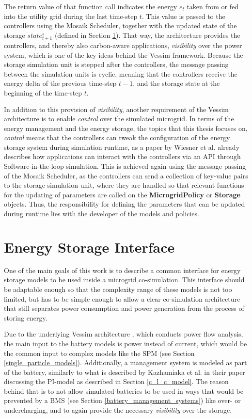The return value of that function call indicates the energy $e_t$ taken from or fed into the utility grid during the last time-step $t$. This value is passed to the controllers using the Mosaik Scheduler, together with the updated state of the storage $state_{t+1}^s$ (defined in Section \ref{energy_storage_interface}). That way, the architecture provides the controllers, and thereby also carbon-aware applications, \textit{visibility} over the power system, which is one of the key ideas behind the Vessim framework. Because the storage simulation unit is stepped after the controllers, the message passing between the simulation units is cyclic, meaning that the controllers receive the energy delta of the previous time-step $t-1$, and the storage state at the beginning of the time-step $t$.

In addition to this provision of \textit{visibility}, another requirement of the Vessim architecture is to enable \textit{control} over the simulated microgrid. In terms of the energy management and the energy storage, the topics that this thesis focuses on, \textit{control} means that the controllers can tweak the configuration of the energy storage system during simulation runtime, as a paper by Wiesner et al. \cite{wiesner2023software} already describes how applications can interact with the controllers via an API through Software-in-the-loop simulation. This is achieved again using the message passing of the Mosaik Scheduler, as the  controllers can send a collection of key-value pairs to the storage simulation unit, where they are handled so that relevant functions for the updating of parameters are called on the \textbf{MicrogridPolicy} or \textbf{Storage} objects. Thus, the responsibility for defining the parameters that can be updated during runtime lies with the developer of the models and policies.

\section{Energy Storage Interface}
\label{energy_storage_interface}
One of the main goals of this work is to describe a common interface for energy storage models to be used inside a microgrid co-simulation. This interface should be adaptable enough so that the complexity range of these models is not too limited, but has to be simple enough to allow a clear co-simulation architecture that still separates power consumption and power generation from the process of storing energy.

Due to the underlying Vessim architecture \cite{vessim}, which conducts power flow analysis, the main input to the battery models is power instead of current, which would be the common input to complex models like the SPM (see Section \ref{single_particle_models}). Additionally, a management system is modeled as part of the battery, similarly to what is described by Kazhamiaka et al. \cite{kazhamiaka2018pimodel} in their paper discussing the PI-model as described in Section \ref{c_l_c_model}. The reason behind that is to not allow simulated batteries to be used in ways that would be prevented by a BMS (see Section \ref{battery_management_systems}) like over- or undercharging, and to again provide the necessary \textit{visibility} over the storage.


